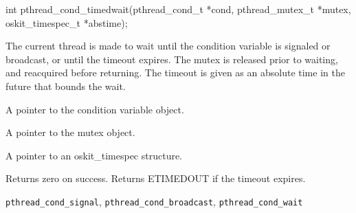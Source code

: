 \begin{apisyn}

	\funcproto int pthread_cond_timedwait(pthread_cond_t *cond,
					      pthread_mutex_t *mutex,
                                              oskit_timespec_t *abstime);
\end{apisyn}
\begin{apidesc}
	The current thread is made to wait until the condition variable is
	signaled or broadcast, or until the timeout expires. The mutex is
	released prior to waiting, and reacquired before returning. The
	timeout is given as an absolute time in the future that bounds the
	wait.
\end{apidesc}
\begin{apiparm}
	\item[cond]
		A pointer to the condition variable object.
	\item[mutex]
		A pointer to the mutex object.
	\item[abstime]
		A pointer to an oskit_timespec structure.
\end{apiparm}
\begin{apiret}
	Returns zero on success. Returns ETIMEDOUT if the timeout expires.
\end{apiret}
\begin{apirel}
	{\tt pthread_cond_signal}, {\tt pthread_cond_broadcast},
	{\tt pthread_cond_wait}
\end{apirel}


